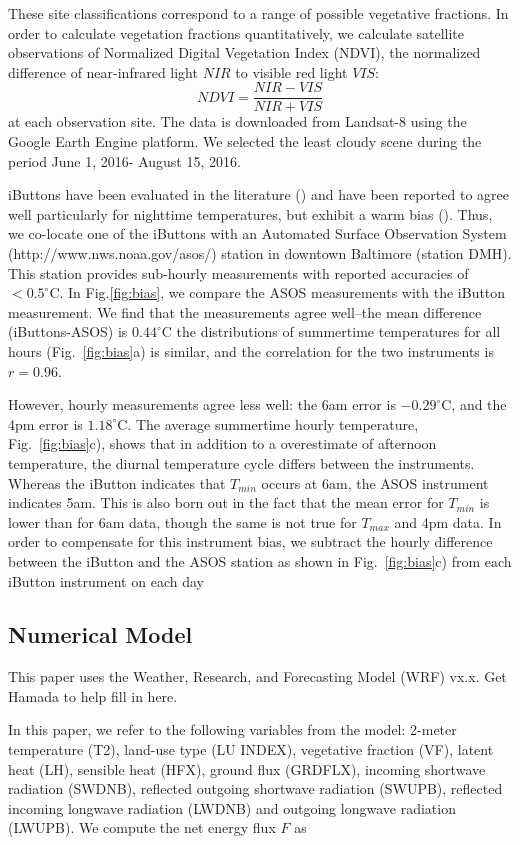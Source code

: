 \documentclass[draft,linenumbers]{agujournal}
\begin{document}
These site classifications correspond to a range of possible vegetative fractions. In order to calculate vegetation fractions quantitatively, we calculate satellite observations of Normalized Digital Vegetation Index (NDVI), the normalized difference of near-infrared light $NIR$ to visible red light $VIS$: 
\[NDVI = \frac{NIR-VIS}{NIR+VIS}\]
at each observation site. The data is downloaded from Landsat-8 using the Google Earth Engine platform. We selected the least cloudy scene during the period June 1, 2016- August 15, 2016. 

iButtons have been evaluated in the literature () and have been reported to agree well particularly for nighttime temperatures, but exhibit a warm bias (). Thus, we co-locate one of the iButtons with an Automated Surface Observation System (http://www.nws.noaa.gov/asos/) station in downtown Baltimore (station DMH). This station provides sub-hourly measurements with reported accuracies of $< 0.5^\circ $C. In Fig.\ref{fig:bias}, we compare the ASOS measurements with the iButton measurement. We find that the measurements agree well--the mean difference (iButtons-ASOS) is $0.44^\circ$C the distributions of summertime temperatures for all hours (Fig.~\ref{fig:bias}a) is similar, and the correlation for the two instruments is $r = 0.96$. 

However, hourly measurements agree less well: the 6am error is $-0.29^\circ$C, and the 4pm error is $1.18^\circ$C. The average summertime hourly temperature, Fig.~\ref{fig:bias}c), shows that in addition to a overestimate of afternoon temperature, the diurnal temperature cycle differs between the instruments. Whereas the iButton indicates that $T_{min}$ occurs at 6am, the ASOS instrument indicates 5am. This is also born out in the fact that the mean error for $T_{min}$ is lower than for 6am data, though the same is not true for $T_{max}$ and 4pm data. In order to compensate for this instrument bias, we subtract the hourly difference between the iButton and the ASOS station as shown in Fig.~\ref{fig:bias}c) from each iButton instrument on each day

\subsection{Numerical Model}
This paper uses the Weather, Research, and Forecasting Model (WRF) vx.x. Get Hamada to help fill in here. 

In this paper, we refer to the following variables from the model: 2-meter temperature (T2),
 land-use type (LU INDEX), vegetative fraction (VF),
 latent heat (LH), 
 sensible heat (HFX), ground flux (GRDFLX), 
incoming shortwave radiation (SWDNB),
reflected outgoing shortwave radiation (SWUPB), 
reflected incoming longwave radiation (LWDNB) and outgoing longwave radiation (LWUPB).  
We compute the net energy flux $F$ as
\end{document}
